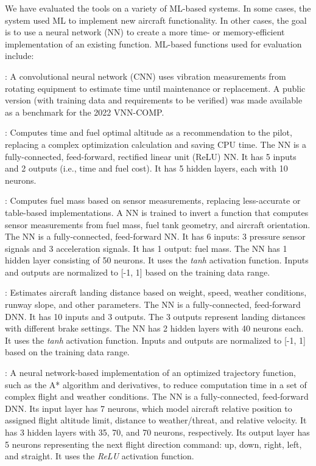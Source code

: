 We have evaluated the tools on a variety of ML-based systems.  In some cases, the system used ML to implement new aircraft functionality.  In other cases, the goal is to use a neural network (NN) to create a more time- or memory-efficient implementation of an existing function.  ML-based functions used for evaluation include:

:  A convolutional neural network (CNN) uses vibration measurements from rotating equipment to estimate time until maintenance or replacement.  A public version (with training data and requirements to be verified) was made available as a benchmark for the 2022 VNN-COMP.


:  Computes time and fuel optimal altitude as a recommendation to the pilot, replacing a complex optimization calculation and saving CPU time. The NN is a fully-connected, feed-forward, rectified linear unit (ReLU) NN. It has 5 inputs and 2 outputs (i.e., time and fuel cost). It has 5 hidden layers, each with 10 neurons.


:  Computes fuel mass based on sensor measurements, replacing less-accurate or table-based implementations.  A NN is trained to invert a function that computes sensor measurements from fuel mass, fuel tank geometry, and aircraft orientation.  The NN is a fully-connected, feed-forward NN. It has 6 inputs: 3 pressure sensor signals and 3 acceleration signals. It has 1 output: fuel mass. The NN has 1 hidden layer consisting of 50 neurons. It uses the \emph{tanh} activation function. Inputs and outputs are normalized to [-1, 1] based on the training data range.


:  Estimates aircraft landing distance based on weight, speed, weather conditions, runway slope, and other parameters.  The NN is a fully-connected, feed-forward DNN. It has 10 inputs and 3 outputs. The 3 outputs represent landing distances with different brake settings. The NN has 2 hidden layers with 40 neurons each. It uses the \emph{tanh} activation function. Inputs and outputs are normalized to [-1, 1] based on the training data range.


: A neural network-based implementation of an optimized trajectory function, such as the A* algorithm and derivatives, to reduce computation time in a set of complex flight and weather conditions. The NN is a fully-connected, feed-forward DNN. Its input layer has 7 neurons, which model aircraft relative position to assigned flight altitude limit, distance to weather/threat, and relative velocity. It has 3 hidden layers with 35, 70, and 70 neurons, respectively. Its output layer has 5 neurons representing the next flight direction command: up, down, right, left, and straight. It uses the \textit{ReLU} activation function. 


